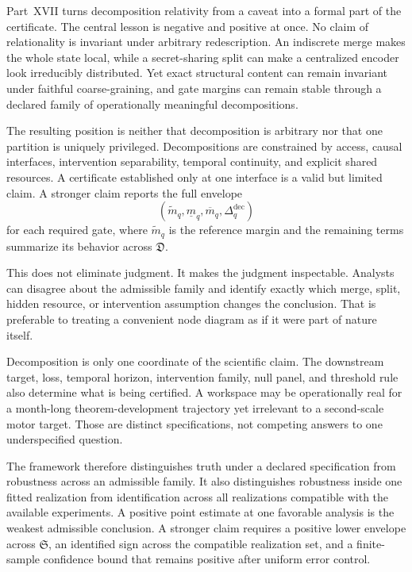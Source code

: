 

Part~XVII turns decomposition relativity from a caveat into a formal part of the
certificate. The central lesson is negative and positive at once. No claim of
relationality is invariant under arbitrary redescription. An indiscrete merge
makes the whole state local, while a secret-sharing split can make a centralized
encoder look irreducibly distributed. Yet exact structural content can remain
invariant under faithful coarse-graining, and gate margins can remain stable
through a declared family of operationally meaningful decompositions.

The resulting position is neither that decomposition is arbitrary nor that one
partition is uniquely privileged. Decompositions are constrained by access,
causal interfaces, intervention separability, temporal continuity, and explicit
shared resources. A certificate established only at one interface is a valid
but limited claim. A stronger claim reports the full envelope
\[
\left(
\widetilde m_q,
\underline m_q,
\overline m_q,
\Delta_q^{\mathrm{dec}}
\right)
\]
for each required gate, where \(\tilde m_q\) is the reference margin and the
remaining terms summarize its behavior across \(\mathfrak D\).

This does not eliminate judgment. It makes the judgment inspectable. Analysts
can disagree about the admissible family and identify exactly which merge,
split, hidden resource, or intervention assumption changes the conclusion.
That is preferable to treating a convenient node diagram as if it were part of
nature itself.


Decomposition is only one coordinate of the scientific claim. The downstream
target, loss, temporal horizon, intervention family, null panel, and threshold
rule also determine what is being certified. A workspace may be operationally
real for a month-long theorem-development trajectory yet irrelevant to a
second-scale motor target. Those are distinct specifications, not competing
answers to one underspecified question.

The framework therefore distinguishes truth under a declared specification
from robustness across an admissible family. It also distinguishes robustness
inside one fitted realization from identification across all realizations
compatible with the available experiments. A positive point estimate at one
favorable analysis is the weakest admissible conclusion. A stronger claim
requires a positive lower envelope across \(\mathfrak S\), an identified sign
across the compatible realization set, and a finite-sample confidence bound
that remains positive after uniform error control.

